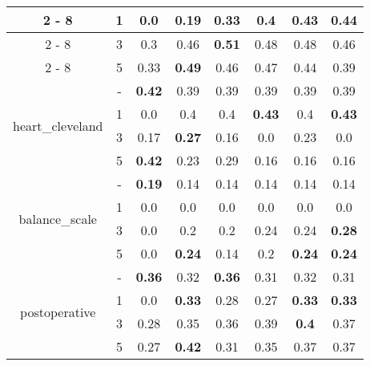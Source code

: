 \documentclass{article}%
\begin{document}
\begin{longtable}{c|c|cccccc}
\cline{2%
-%
8}%
&1&0.0&0.19&0.33&0.4&0.43&\textbf{0.44}\\%
\cline{2%
-%
8}%
&3&0.3&0.46&\textbf{0.51}&0.48&0.48&0.46\\%
\cline{2%
-%
8}%
&5&0.33&\textbf{0.49}&0.46&0.47&0.44&0.39\\%
\hline%
\multirow{4}{*}{heart\_cleveland}&{-}&\textbf{0.42}&0.39&0.39&0.39&0.39&0.39\\%
\cline{2%
-%
8}%
&1&0.0&0.4&0.4&\textbf{0.43}&0.4&\textbf{0.43}\\%
\cline{2%
-%
8}%
&3&0.17&\textbf{0.27}&0.16&0.0&0.23&0.0\\%
\cline{2%
-%
8}%
&5&\textbf{0.42}&0.23&0.29&0.16&0.16&0.16\\%
\hline%
\multirow{4}{*}{balance\_scale}&{-}&\textbf{0.19}&0.14&0.14&0.14&0.14&0.14\\%
\cline{2%
-%
8}%
&1&0.0&0.0&0.0&0.0&0.0&0.0\\%
\cline{2%
-%
8}%
&3&0.0&0.2&0.2&0.24&0.24&\textbf{0.28}\\%
\cline{2%
-%
8}%
&5&0.0&\textbf{0.24}&0.14&0.2&\textbf{0.24}&\textbf{0.24}\\%
\hline%
\multirow{4}{*}{postoperative}&{-}&\textbf{0.36}&0.32&\textbf{0.36}&0.31&0.32&0.31\\%
\cline{2%
-%
8}%
&1&0.0&\textbf{0.33}&0.28&0.27&\textbf{0.33}&\textbf{0.33}\\%
\cline{2%
-%
8}%
&3&0.28&0.35&0.36&0.39&\textbf{0.4}&0.37\\%
\cline{2%
-%
8}%
&5&0.27&\textbf{0.42}&0.31&0.35&0.37&0.37\\%
\hline%
\end{longtable}

%
\end{document}
